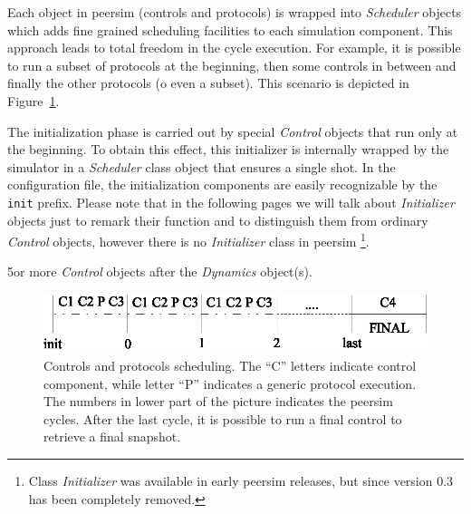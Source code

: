 \documentclass[a4paper,11pt]{article}
\begin{document}
Each object in peersim (controls and protocols) is wrapped into
\emph{Scheduler} objects which adds fine grained scheduling facilities to each
simulation component. This approach leads to total freedom in the
cycle execution. For example, it is possible to run a subset of
protocols at the beginning, then some controls in between and finally
the other protocols (o even a subset). This scenario is depicted in
Figure~\ref{obsfigure}. 

The initialization phase is carried out by special \emph{Control}
objects that run only at the beginning. To obtain this effect, this
initializer is internally wrapped by the simulator in a \emph{Scheduler} 
class object that ensures a single shot. In the configuration file,
the initialization components are easily recognizable by the
\texttt{init} prefix. Please note that in the following pages we will
talk about \emph{Initializer} objects just to remark their function and
to distinguish them from ordinary \emph{Control} objects, however there
is no \emph{Initializer} class in peersim
\footnote{Class
  \emph{Initializer} was available in early peersim releases, but
  since version 0.3 has been completely removed.}.

5or more \emph{Control} objects after the \emph{Dynamics} object(s).


\begin{figure}
\begin{center}
\includegraphics[scale=1.1]{controls-protocols.eps}
\end{center}
\caption{Controls and protocols scheduling. The ``C'' letters indicate
  control component, while letter ``P'' indicates a generic protocol
  execution. The numbers in lower part of the picture indicates the
  peersim cycles. After the last cycle, it is possible to run a final
  control to retrieve a final snapshot.\label{obsfigure}}
\end{figure}
\end{document}
